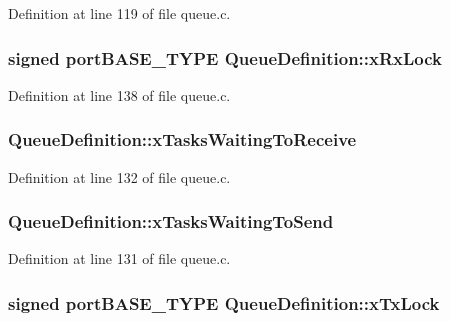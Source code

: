 Definition at line 119 of file queue.\-c.

\hypertarget{struct_queue_definition_ad7c6ccbee34deed4a438354a0d3cf765}{
\subsubsection[{x\-Rx\-Lock}]{\setlength{\rightskip}{0pt plus 5cm}signed port\-B\-A\-S\-E\-\_\-\-T\-Y\-P\-E Queue\-Definition\-::x\-Rx\-Lock}}\label{struct_queue_definition_ad7c6ccbee34deed4a438354a0d3cf765}


Definition at line 138 of file queue.\-c.

\hypertarget{struct_queue_definition_a3f26a41f0c0d17fc4645905b309b33aa}{
\subsubsection[{x\-Tasks\-Waiting\-To\-Receive}]{ Queue\-Definition\-::x\-Tasks\-Waiting\-To\-Receive}}\label{struct_queue_definition_a3f26a41f0c0d17fc4645905b309b33aa}


Definition at line 132 of file queue.\-c.

\hypertarget{struct_queue_definition_a073ad0a31a51508395efd54599c73ee1}{
\subsubsection[{x\-Tasks\-Waiting\-To\-Send}]{ Queue\-Definition\-::x\-Tasks\-Waiting\-To\-Send}}\label{struct_queue_definition_a073ad0a31a51508395efd54599c73ee1}


Definition at line 131 of file queue.\-c.

\hypertarget{struct_queue_definition_a295eddccfd1515f1fe5b12b9e9ec81e0}{
\subsubsection[{x\-Tx\-Lock}]{\setlength{\rightskip}{0pt plus 5cm}signed port\-B\-A\-S\-E\-\_\-\-T\-Y\-P\-E Queue\-Definition\-::x\-Tx\-Lock}}\label{struct_queue_definition_a295eddccfd1515f1fe5b12b9e9ec81e0}


